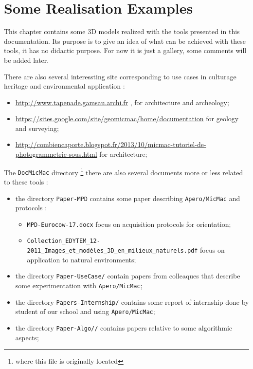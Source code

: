 \chapter{Some Realisation Examples}


This chapter contains some 3D models realized with the tools presented
in this documentation. Its purpose is to give an idea of what can be achieved with these tools, 
it has no didactic purpose.  
For now it is just a gallery, some comments will be added later.

There are also several interessting site corresponding to use
cases in culturage heritage and environmental application :

\begin{itemize}
   \item \url{http://www.tapenade.gamsau.archi.fr} , for architecture and 
         archeology;

   \item \url{https://sites.google.com/site/geomicmac/home/documentation}
         for geology and surveying;

   \item \url{ http://combiencaporte.blogspot.fr/2013/10/micmac-tutoriel-de-photogrammetrie-sous.html}
         for architecture;
\end{itemize}

The {\tt DocMicMac} directory \footnote{where this file  is originally located}
there are also several documents more or less related to these tools :

\begin{itemize}
   \item  the directory {\tt Paper-MPD} contains some paper describing {\tt Apero/MicMac}
          and protocols :

          \begin{itemize}
              \item {\tt MPD-Eurocow-17.docx} focus on acquisition protocols for orientation;
              \item {\tt Collection\_EDYTEM\_12-2011\_Images\_et\_modèles\_3D\_en\_milieux\_naturels.pdf} 
                    focus on application to natural environments;
          \end{itemize}

   \item  the directory {\tt Paper-UseCase/} contain papers from colleaques that describe some
          experimentation with {\tt Apero/MicMac};

   \item  the directory {\tt Papers-Internship/} contains some report of internship done
          by student of our school and using {\tt Apero/MicMac};

   \item  the directory {\tt Paper-Algo//} contains papers relative to some algorithmic aspects;
\end{itemize}

